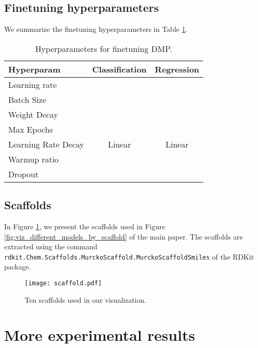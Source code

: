 \documentclass{article}
\newcommand{\ourM}{DMP}
\begin{document}
\subsection{Finetuning hyperparameters}\label{appendix:finetuninghyperparaments}
We summarize the finetuning hyperparameters in Table \ref{tab:finetuning_hyperparameter}.
\begin{table}[!h]
    \centering
    \begin{tabular}{lcc}
    \toprule
    \textbf{Hyperparam} & \textbf{Classification} & \textbf{Regression} \\
    \midrule
      Learning rate &  &  \\
      Batch Size & &  \\
      Weight Decay & & \\
      Max Epochs && \\
      Learning Rate Decay &Linear&Linear \\
      Warmup ratio& & \\
      Dropout & & \\
      \bottomrule
    \end{tabular}
    \caption{Hyperparameters for finetuning \ourM{}.}
    \label{tab:finetuning_hyperparameter}
\end{table}
\subsection{Scaffolds}\label{appendix:scaffold}
In Figure \ref{fig:scaffold}, we present the scaffolds used in Figure \ref{fig:viz_different_models_by_scaffold} of the main paper. The scaffolds are extracted using the command \texttt{rdkit.Chem.Scaffolds.MurckoScaffold.MurckoScaffoldSmiles} of the RDKit package.
\begin{figure}[!htb]
    \centering
    \texttt{[image: scaffold.pdf]}
    \caption{Ten scaffolds used in our visualization.}
    \label{fig:scaffold}
\end{figure}
\section{More experimental results}
\end{document}
